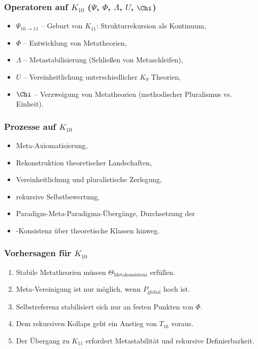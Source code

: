 \subsubsection{Operatoren auf $K_{10}$ ($\Psi$, $\Phi$, $\Lambda$, $U$, $\Chi$)}

\begin{itemize}
    \item $\Psi_{10\to11}$ – Geburt von $K_{11}$: Strukturrekursion als Kontinuum,
    \item $\Phi$ – Entwicklung von Metatheorien,
    \item $\Lambda$ – Metastabilisierung (Schließen von Metaschleifen),
    \item $U$ – Vereinheitlichung unterschiedlicher $K_9$ Theorien,
    \item $\Chi$ – Verzweigung von Metatheorien (methodischer Pluralismus vs. Einheit).
\end{itemize}

\subsubsection{Prozesse auf $K_{10}$}

\begin{itemize}
    \item Meta-Axiomatisierung,
    \item Rekonstruktion theoretischer Landschaften,
    \item Vereinheitlichung und pluralistische Zerlegung,
    \item rekursive Selbstbewertung,
    \item Paradigm-Meta-Paradigma-Übergänge,
    Durchsetzung der \item-Konsistenz über theoretische Klassen hinweg.
\end{itemize}

\subsubsection{Vorhersagen für $K_{10}$}

\begin{enumerate}
    \item Stabile Metatheorien müssen $\Theta_{\mathrm{Metakonsistenz}}$ erfüllen.
    \item Meta-Vereinigung ist nur möglich, wenn $P_{\mathrm{global}}$ hoch ist.
    \item Selbstreferenz stabilisiert sich nur an festen Punkten von $\Phi$.
    \item Dem rekursiven Kollaps geht ein Anstieg von $T_{10}$ voraus.
    \item Der Übergang zu $K_{11}$ erfordert Metastabilität und rekursive Definierbarkeit.
\end{enumerate}

